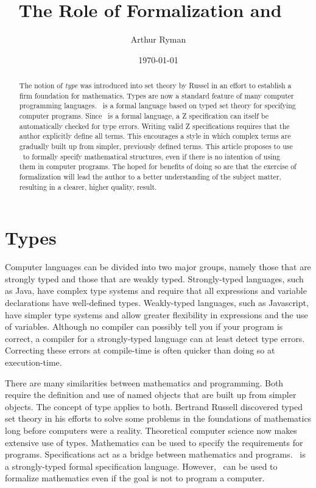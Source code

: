 \documentclass{amsart}
\begin{document}
\title{The Role of Formalization and \ZN\ }
\author{Arthur Ryman}
\date{\today}

\begin{abstract}
The notion of {\it type} was introduced into set theory by Russel in an effort to establish a firm foundation for mathematics.
Types are now a standard feature of many computer programming languages.
\ZN\  is a formal language based on typed set theory for specifying computer programs.
Since \ZN\  is a formal language, a Z specification can itself be automatically checked for type errors.
Writing valid Z specifications requires that the author explicitly define all terms.
This encourages a style in which complex terms are gradually built up from simpler, previously defined terms.
This article proposes to use \ZN\  to formally specify mathematical structures, even if there is no intention of using
them in computer programs.
The hoped for benefits of doing so are that the exercise of formalization will lead the author to a better understanding of the subject
matter, resulting in a clearer, higher quality, result.
\end{abstract}

\maketitle

\tableofcontents

\section{Types}

Computer languages can be divided into two major groups, namely those that are strongly typed and those that are weakly typed.
Strongly-typed languages, such as Java, have complex type systems and require that all expressions and variable declarations 
have well-defined types.
Weakly-typed languages, such as Javascript, have simpler type systems and allow greater flexibility in expressions and the use of variables.
Although no compiler can possibly tell you if your program is correct, a compiler for a strongly-typed language can at least detect type errors.
Correcting these errors at compile-time is often quicker than doing so at execution-time.

There are many similarities between mathematics and programming. 
Both require the definition and use of named objects that are built up from simpler objects.
The concept of type applies to both.
Bertrand Russell discovered typed set theory in his efforts to solve some problems in the foundations of mathematics 
long before computers were a reality.
Theoretical computer science now makes extensive use of types.
Mathematics can be used to specify the requirements for programs.
Specifications act as a bridge between mathematics and programs.
\ZN\  is a strongly-typed formal specification language.
However, \ZN\  can be used to formalize mathematics even if the goal is not to program a computer.
\end{document}
